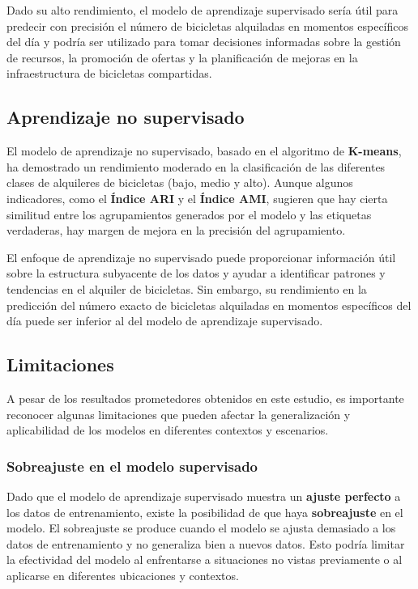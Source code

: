 \documentclass{wsdcr}
\begin{document}
Dado su alto rendimiento, el modelo de aprendizaje supervisado sería útil para predecir con precisión el número de bicicletas alquiladas en momentos específicos del día y podría ser utilizado para tomar decisiones informadas sobre la gestión de recursos, la promoción de ofertas y la planificación de mejoras en la infraestructura de bicicletas compartidas.

\subsection{Aprendizaje no supervisado}

El modelo de aprendizaje no supervisado, basado en el algoritmo de \textbf{K-means}, ha demostrado un rendimiento moderado en la clasificación de las diferentes clases de alquileres de bicicletas (bajo, medio y alto). Aunque algunos indicadores, como el \textbf{Índice ARI} y el \textbf{Índice AMI}, sugieren que hay cierta similitud entre los agrupamientos generados por el modelo y las etiquetas verdaderas, hay margen de mejora en la precisión del agrupamiento.

El enfoque de aprendizaje no supervisado puede proporcionar información útil sobre la estructura subyacente de los datos y ayudar a identificar patrones y tendencias en el alquiler de bicicletas. Sin embargo, su rendimiento en la predicción del número exacto de bicicletas alquiladas en momentos específicos del día puede ser inferior al del modelo de aprendizaje supervisado.

\subsection{Limitaciones}

A pesar de los resultados prometedores obtenidos en este estudio, es importante reconocer algunas limitaciones que pueden afectar la generalización y aplicabilidad de los modelos en diferentes contextos y escenarios.

\subsubsection{Sobreajuste en el modelo supervisado}

Dado que el modelo de aprendizaje supervisado muestra un \textbf{ajuste perfecto} a los datos de entrenamiento, existe la posibilidad de que haya \textbf{sobreajuste} en el modelo. El sobreajuste se produce cuando el modelo se ajusta demasiado a los datos de entrenamiento y no generaliza bien a nuevos datos. Esto podría limitar la efectividad del modelo al enfrentarse a situaciones no vistas previamente o al aplicarse en diferentes ubicaciones y contextos.
\end{document}
